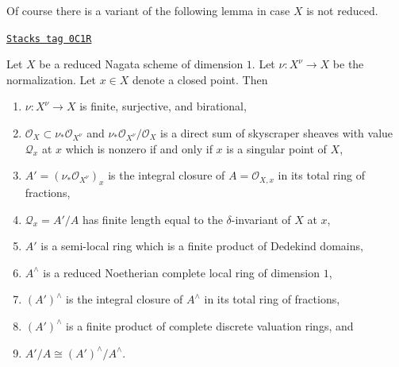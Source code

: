 Of course there is a variant of the following lemma in case
$X$ is not reduced.

\begin{lemma}
\label{varieties-lemma-prepare-delta-invariant}
\href{https://stacks.math.columbia.edu/tag/0C1R}{\texttt{Stacks tag 0C1R}}

Let $X$ be a reduced Nagata scheme of dimension $1$. Let $\nu : X^\nu \to X$
be the normalization. Let $x \in X$ denote a closed point. Then
\begin{enumerate}
\item $\nu : X^\nu \to X$ is finite, surjective, and birational,
\item $\mathcal{O}_X \subset \nu_*\mathcal{O}_{X^\nu}$ and
$\nu_*\mathcal{O}_{X^\nu}/\mathcal{O}_X$ is a direct sum of
skyscraper sheaves with value $\mathcal{Q}_x$ at $x$ which is nonzero
if and only if $x$ is a singular point of $X$,
\item $A' = (\nu_*\mathcal{O}_{X^\nu})_x$ is the integral closure
of $A = \mathcal{O}_{X, x}$ in its total ring of fractions,
\item $\mathcal{Q}_x = A'/A$ has finite length equal to the
$\delta$-invariant of $X$ at $x$,
\item $A'$ is a semi-local ring which is a finite product of
Dedekind domains,
\item $A^\wedge$ is a reduced Noetherian complete
local ring of dimension $1$,
\item $(A')^\wedge$ is the integral closure of $A^\wedge$
in its total ring of fractions,
\item $(A')^\wedge$ is a finite product of
complete discrete valuation rings, and
\item $A'/A \cong (A')^\wedge/A^\wedge$.
\end{enumerate}
\end{lemma}

